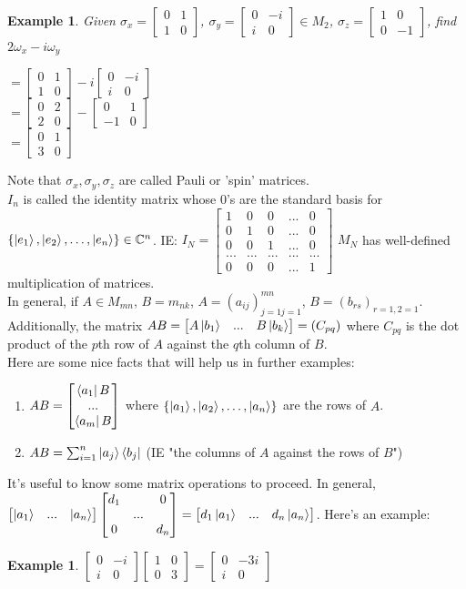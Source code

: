 \documentclass[12pt]{article}
\theoremstyle{plain}
\theoremstyle{nonumberplain}
\theoremstyle{plain}
\newtheorem{example}[lemma]{Example}
\theoremstyle{nonumberplain}
\newcommand\1{{\bf 1}}
\newcommand{\bmat}[1]{\begin{bmatrix*} #1 \end{bmatrix*}} %
\newcommand{\C}{\mathbb{C}} %
\newcommand{\<}{\left\langle}
\renewcommand{\>}{\right\rangle}
\newcommand{\lb}{\left\{}
\newcommand{\rb}{\right\}}
\newcommand{\setofkets}[1]{\lb \ket{#1_1}, \ket{#1_2}, \ldots, \ket{#1_n}\rb} %
\begin{document}
\begin{example}
Given $\sigma_x=\bmat{0 & 1 \\ 1 & 0}$, $\sigma_y=\bmat{0 & -i \\ i & 0}\in M_2$, $\sigma_z=\bmat{1 & 0 \\ 0 & -1}$, find $2\omega_x-i\omega_y$
\begin{center}
$=\bmat{0 & 1 \\ 1 & 0}-i\bmat{0 & -i \\ i & 0}$ \\
$=\bmat{0 & 2 \\ 2 & 0}-\bmat{0 & 1 \\ -1 & 0}$ \\
$=\bmat{0 & 1 \\ 3 & 0}$
\end{center}
\end{example}
Note that $\sigma_x,\sigma_y,\sigma_z$ are called Pauli or 'spin' matrices. \\
$I_n$ is called the identity matrix whose $0$'s are the standard basis for $\setofkets{e}\in\C^n$. IE: $I_N=\bmat{1 & 0 & 0 & ... & 0 \\ 0 & 1 & 0 & ... & 0 \\ 0 & 0 & 1 & ... & 0 \\ ... & ... & ... & ... & ... \\ 0 & 0 & 0 & ... & 1}$ $M_N$ has well-defined multiplication of matrices. \\ In general, if $A\in M_{mn}$, $B=m_{nk}$, $A=(a_{ij})^{mn}_{j=1 j=1}$, $B=(b_{rs})_{r=1, 2=1}$. Additionally, the matrix $AB=\bmat{A\ket{b_1} & ... & B\ket{b_k}}=(C_{pq})$ where $C_{pq}$ is the dot product of the $p$th row of $A$ against the $q$th column of $B$. \\
Here are some nice facts that will help us in further examples:
\begin{enumerate}
\item $AB=\bmat{\bra{a_1}B \\ ... \\ \bra{a_m}B}$ where $\setofkets{a}$ are the rows of $A$.
\item $AB=\sum^n_{i=1}\ket{a_j}\bra{b_j}$ (IE "the columns of $A$ against the rows of $B$")
\end{enumerate}
It's useful to know some matrix operations to proceed. In general, $\bmat{\ket{a_1} & ... & \ket{a_n}}\bmat{d_1 & & 0 \\ & ... & \\ 0 & & d_n}=\bmat{d_1\ket{a_1} & ... & d_n\ket{a_n}}$. Here's an example:
\begin{example}
$\bmat{0 & -i \\ i & 0}\bmat{1 & 0 \\ 0 & 3}=\bmat{0 & -3i \\ i & 0}$
\end{example}
\end{document}
